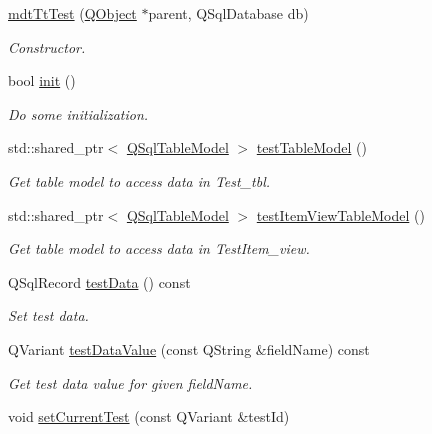 \begin{DoxyCompactItemize}
\item 
\hyperlink{classmdt_tt_test_a607eadd86d30aa34dbd9daaf4c03725c}{mdt\-Tt\-Test} (\hyperlink{class_q_object}{Q\-Object} $\ast$parent, Q\-Sql\-Database db)
\begin{DoxyCompactList}\small\item\em Constructor. \end{DoxyCompactList}\item 
bool \hyperlink{classmdt_tt_test_a60a82c6d8b5ed6b8adc6266fe93d2526}{init} ()
\begin{DoxyCompactList}\small\item\em Do some initialization. \end{DoxyCompactList}\item 
std\-::shared\-\_\-ptr$<$ \hyperlink{class_q_sql_table_model}{Q\-Sql\-Table\-Model} $>$ \hyperlink{classmdt_tt_test_aebdaaadfb3e9c2aee832e7e0d664f084}{test\-Table\-Model} ()
\begin{DoxyCompactList}\small\item\em Get table model to access data in Test\-\_\-tbl. \end{DoxyCompactList}\item 
std\-::shared\-\_\-ptr$<$ \hyperlink{class_q_sql_table_model}{Q\-Sql\-Table\-Model} $>$ \hyperlink{classmdt_tt_test_a01b64938f429e83cf64566204aa7dfb2}{test\-Item\-View\-Table\-Model} ()
\begin{DoxyCompactList}\small\item\em Get table model to access data in Test\-Item\-\_\-view. \end{DoxyCompactList}\item 
Q\-Sql\-Record \hyperlink{classmdt_tt_test_a4afb87f864f8a7713b1ed4b32f6af643}{test\-Data} () const 
\begin{DoxyCompactList}\small\item\em Set test data. \end{DoxyCompactList}\item 
Q\-Variant \hyperlink{classmdt_tt_test_ae778ca6fe9b4a410038d22dcc0699d0e}{test\-Data\-Value} (const Q\-String \&field\-Name) const 
\begin{DoxyCompactList}\small\item\em Get test data value for given field\-Name. \end{DoxyCompactList}\item 
void \hyperlink{classmdt_tt_test_a9985a499cd6c43b31c4d36fd95891051}{set\-Current\-Test} (const Q\-Variant \&test\-Id)

\end{DoxyCompactItemize}
